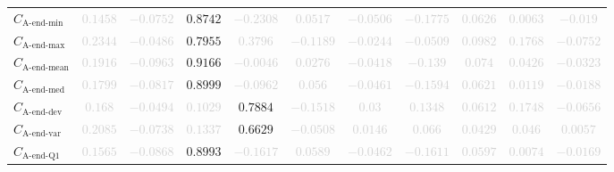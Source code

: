 \documentclass{standalone}
\newcommand{\lastminname}{\text{A-end-min}}
\newcommand{\lastmin}{C_{\lastminname}}
\newcommand{\lastmaxname}{\text{A-end-max}}
\newcommand{\lastmax}{C_{\lastmaxname}}
\newcommand{\lastmeanname}{\text{A-end-mean}}
\newcommand{\lastmean}{C_{\lastmeanname}}
\newcommand{\lastmedianname}{\text{A-end-med}}
\newcommand{\lastmedian}{C_{\lastmedianname}}
\newcommand{\lastdevname}{\text{A-end-dev}}
\newcommand{\lastdev}{C_{\lastdevname}}
\newcommand{\lastvarname}{\text{A-end-var}}
\newcommand{\lastvar}{C_{\lastvarname}}
\newcommand{\lastqonename}{\text{A-end-Q1}}
\newcommand{\lastqone}{C_{\lastqonename}}
\begin{document}
\begin{tabular}{lcccccccccc}
$\lastmin$ & \textcolor{lightgray}{$0.1458$} & \textcolor{lightgray}{$-0.0752$} & $0.8742$ & \textcolor{lightgray}{$-0.2308$} & \textcolor{lightgray}{$0.0517$} & \textcolor{lightgray}{$-0.0506$} & \textcolor{lightgray}{$-0.1775$} & \textcolor{lightgray}{$0.0626$} & \textcolor{lightgray}{$0.0063$} & \textcolor{lightgray}{$-0.019$} \\ 
$\lastmax$ & \textcolor{lightgray}{$0.2344$} & \textcolor{lightgray}{$-0.0486$} & $0.7955$ & \textcolor{lightgray}{$0.3796$} & \textcolor{lightgray}{$-0.1189$} & \textcolor{lightgray}{$-0.0244$} & \textcolor{lightgray}{$-0.0509$} & \textcolor{lightgray}{$0.0982$} & \textcolor{lightgray}{$0.1768$} & \textcolor{lightgray}{$-0.0752$} \\ 
$\lastmean$ & \textcolor{lightgray}{$0.1916$} & \textcolor{lightgray}{$-0.0963$} & $0.9166$ & \textcolor{lightgray}{$-0.0046$} & \textcolor{lightgray}{$0.0276$} & \textcolor{lightgray}{$-0.0418$} & \textcolor{lightgray}{$-0.139$} & \textcolor{lightgray}{$0.074$} & \textcolor{lightgray}{$0.0426$} & \textcolor{lightgray}{$-0.0323$} \\ 
$\lastmedian$ & \textcolor{lightgray}{$0.1799$} & \textcolor{lightgray}{$-0.0817$} & $0.8999$ & \textcolor{lightgray}{$-0.0962$} & \textcolor{lightgray}{$0.056$} & \textcolor{lightgray}{$-0.0461$} & \textcolor{lightgray}{$-0.1594$} & \textcolor{lightgray}{$0.0621$} & \textcolor{lightgray}{$0.0119$} & \textcolor{lightgray}{$-0.0188$} \\ 
$\lastdev$ & \textcolor{lightgray}{$0.168$} & \textcolor{lightgray}{$-0.0494$} & \textcolor{lightgray}{$0.1029$} & $0.7884$ & \textcolor{lightgray}{$-0.1518$} & \textcolor{lightgray}{$0.03$} & \textcolor{lightgray}{$0.1348$} & \textcolor{lightgray}{$0.0612$} & \textcolor{lightgray}{$0.1748$} & \textcolor{lightgray}{$-0.0656$} \\ 
$\lastvar$ & \textcolor{lightgray}{$0.2085$} & \textcolor{lightgray}{$-0.0738$} & \textcolor{lightgray}{$0.1337$} & $0.6629$ & \textcolor{lightgray}{$-0.0508$} & \textcolor{lightgray}{$0.0146$} & \textcolor{lightgray}{$0.066$} & \textcolor{lightgray}{$0.0429$} & \textcolor{lightgray}{$0.046$} & \textcolor{lightgray}{$0.0057$} \\ 
$\lastqone$ & \textcolor{lightgray}{$0.1565$} & \textcolor{lightgray}{$-0.0868$} & $0.8993$ & \textcolor{lightgray}{$-0.1617$} & \textcolor{lightgray}{$0.0589$} & \textcolor{lightgray}{$-0.0462$} & \textcolor{lightgray}{$-0.1611$} & \textcolor{lightgray}{$0.0597$} & \textcolor{lightgray}{$0.0074$} & \textcolor{lightgray}{$-0.0169$} \\ 

\end{tabular}
\end{document}
